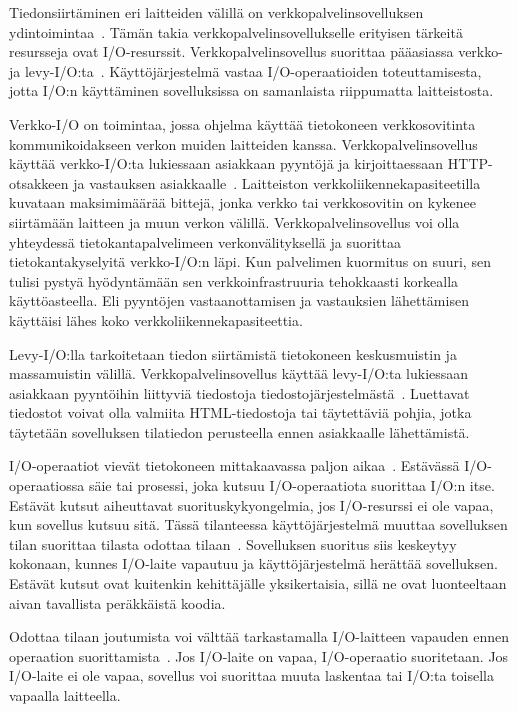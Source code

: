 \documentclass[finnish]{tktltiki2}%
\theoremstyle{definition}
\theoremstyle{remark}
\begin{document}
Tiedonsiirtäminen eri laitteiden välillä on verkkopalvelinsovelluksen
ydintoimintaa~\cite{pai_flash_1999}.
Tämän takia verkkopalvelinsovellukselle erityisen tärkeitä resursseja ovat
I/O-resurssit.
Verkkopalvelinsovellus suorittaa pääasiassa verkko-ja levy-I/O:ta~\cite{pai_flash_1999}.
Käyttöjärjestelmä vastaa I/O-operaatioiden toteuttamisesta,
jotta I/O:n käyttäminen sovelluksissa on samanlaista
riippumatta laitteistosta.

Verkko-I/O on toimintaa, jossa ohjelma käyttää tietokoneen
verkkosovitinta kommunikoidakseen verkon muiden laitteiden kanssa.
Verkkopalvelinsovellus käyttää verkko-I/O:ta lukiessaan
asiakkaan pyyntöjä ja kirjoittaessaan HTTP-otsakkeen ja
vastauksen asiakkaalle~\cite{pai_flash_1999}.
Laitteiston verkkoliikennekapasiteetilla kuvataan maksimimäärää bittejä,
jonka verkko tai verkkosovitin on kykenee siirtämään laitteen ja muun
verkon välillä.
Verkkopalvelinsovellus voi olla yhteydessä tietokantapalvelimeen
verkonvälityksellä ja suorittaa tietokantakyselyitä verkko-I/O:n läpi.
Kun palvelimen kuormitus on suuri, sen tulisi pystyä hyödyntämään
sen verkkoinfrastruuria tehokkaasti korkealla käyttöasteella. Eli
pyyntöjen vastaanottamisen ja vastauksien lähettämisen käyttäisi
lähes koko verkkoliikennekapasiteettia.

Levy-I/O:lla tarkoitetaan tiedon siirtämistä
tietokoneen keskusmuistin ja massamuistin välillä.
Verkkopalvelinsovellus käyttää levy-I/O:ta lukiessaan
asiakkaan pyyntöihin liittyviä tiedostoja tiedostojärjestelmästä~\cite{pai_flash_1999}.
Luettavat tiedostot voivat olla valmiita HTML-tiedostoja tai täytettäviä
pohjia, jotka täytetään sovelluksen tilatiedon perusteella ennen
asiakkaalle lähettämistä.

I/O-operaatiot vievät tietokoneen mittakaavassa paljon
aikaa~\cite{pai_flash_1999}. Estävässä I/O-operaatiossa säie tai prosessi,
joka kutsuu I/O-operaatiota suorittaa I/O:n itse.
Estävät kutsut aiheuttavat suorituskykyongelmia, jos
I/O-resurssi ei ole vapaa, kun sovellus kutsuu sitä.
Tässä tilanteessa käyttöjärjestelmä muuttaa sovelluksen
tilan suorittaa tilasta odottaa tilaan~\cite{stallings_operating_2018}.
Sovelluksen suoritus
siis keskeytyy kokonaan, kunnes I/O-laite vapautuu ja käyttöjärjestelmä
herättää sovelluksen.
Estävät kutsut ovat kuitenkin kehittäjälle yksikertaisia, sillä
ne ovat luonteeltaan aivan tavallista peräkkäistä
koodia.

Odottaa tilaan joutumista voi välttää tarkastamalla
I/O-laitteen vapauden ennen operaation suorittamista~\cite{schmidt_reactor:_1995}.
Jos
I/O-laite on vapaa, I/O-operaatio suoritetaan. Jos I/O-laite
ei ole vapaa, sovellus voi suorittaa muuta laskentaa tai I/O:ta
toisella vapaalla laitteella.
\end{document}

